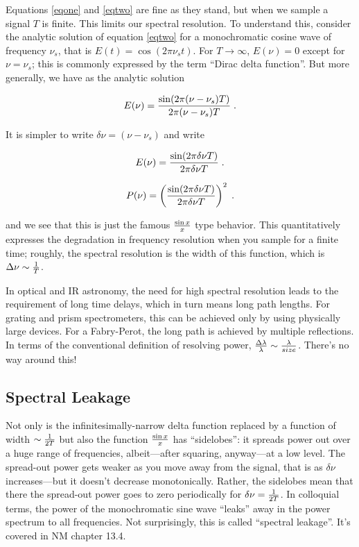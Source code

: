 \documentclass[preprint]{aastex}
\begin{document}
        Equations \ref{eqone} and \ref{eqtwo} are fine as they stand,
but when we sample a signal $T$ is finite. This limits our spectral
resolution. To understand this, consider the analytic solution of
equation \ref{eqtwo} for a monochromatic cosine wave of frequency
$\nu_s$, that is $E(t) = \cos(2 \pi \nu_s t)$.  For $T \rightarrow
\infty$, $E(\nu) = 0$ except for $\nu = \nu_s$; this is commonly
expressed by the term ``Dirac delta function''.  But more generally, we
have as the analytic solution

\begin{equation} \label{sinxoverx}
E(\nu) = {\sin (2 \pi (\nu - \nu_s) T) \over 2 \pi (\nu - \nu_s)
T} \; .  
\end{equation}

\noindent It is simpler to write $\delta \nu = (\nu - \nu_s)$ and write

\begin{equation}
E(\nu) = {\sin (2 \pi \delta \nu T) \over 2 \pi \delta \nu T} \; .
\end{equation}

\begin{equation}
P(\nu) = \left ({\sin (2 \pi \delta \nu T) \over 2 \pi \delta \nu T}
\right)^2 \; .
\end{equation}

\noindent and we see that this is just the famous $\sin x \over x$ type
behavior.  This quantitatively expresses the degradation in frequency
resolution when you sample for a finite time; roughly, the spectral
resolution is the width of this function, which is $\Delta \nu \sim {1
\over T}$.

	In optical and IR astronomy, the need for high spectral
resolution leads to the requirement of long time delays, which in turn
means long path lengths. For grating and prism spectrometers, this can
be achieved only by using physically large devices. For a Fabry-Perot,
the long path is achieved by multiple reflections. In terms of the
conventional definition of resolving power, ${\Delta \lambda \over
\lambda} \sim {\lambda \over size}$. There's no way around this!

\subsection{Spectral Leakage}

	Not only is the infinitesimally-narrow delta function replaced by
a function of width $\sim {1 \over 2T}$ but also the function $\sin x
\over x$ has ``sidelobes'': it spreads power out over a huge range of
frequencies, albeit---after squaring, anyway---at a low level.  The
spread-out power gets weaker as you move away from the signal, that is
as $\delta \nu$ increases---but it doesn't decrease monotonically. 
Rather, the    sidelobes mean that there the spread-out power goes to
zero periodically for $\delta \nu = {1 \over 2T}$.  In colloquial terms,
the power of the monochromatic sine wave ``leaks'' away in the power
spectrum to all frequencies.  Not surprisingly, this is called
``spectral leakage''. It's covered in NM chapter 13.4.
\end{document}
